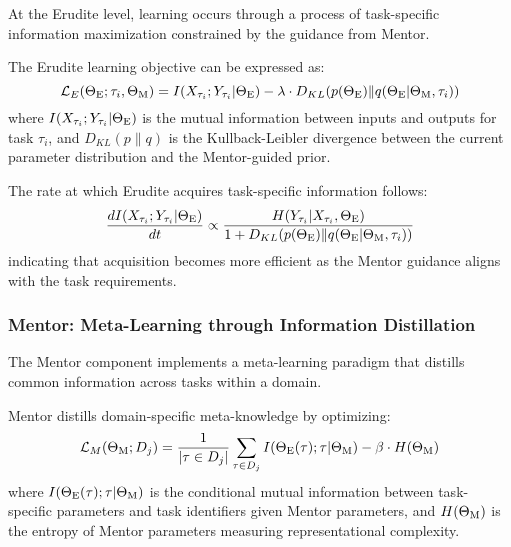 At the Erudite level, learning occurs through a process of task-specific information maximization constrained by the guidance from Mentor.

\begin{theorem}
The Erudite learning objective can be expressed as:
\begin{equation}
\mathcal{L}_E(\Theta_{\text{E}}; \tau_i, \Theta_{\text{M}}) = I(X_{\tau_i}; Y_{\tau_i} | \Theta_{\text{E}}) - \lambda \cdot D_{KL}(p(\Theta_{\text{E}}) \| q(\Theta_{\text{E}} | \Theta_{\text{M}}, \tau_i))
\end{equation}
where $I(X_{\tau_i}; Y_{\tau_i} | \Theta_{\text{E}})$ is the mutual information between inputs and outputs for task $\tau_i$, and $D_{KL}(p \| q)$ is the Kullback-Leibler divergence between the current parameter distribution and the Mentor-guided prior.
\end{theorem}

\begin{proposition}
The rate at which Erudite acquires task-specific information follows:
\begin{equation}
\frac{dI(X_{\tau_i}; Y_{\tau_i} | \Theta_{\text{E}})}{dt} \propto \frac{H(Y_{\tau_i} | X_{\tau_i}, \Theta_{\text{E}})}{1 + D_{KL}(p(\Theta_{\text{E}}) \| q(\Theta_{\text{E}} | \Theta_{\text{M}}, \tau_i))}
\end{equation}
indicating that acquisition becomes more efficient as the Mentor guidance aligns with the task requirements.
\end{proposition}

\subsubsection{Mentor: Meta-Learning through Information Distillation}

The Mentor component implements a meta-learning paradigm that distills common information across tasks within a domain.

\begin{theorem}
Mentor distills domain-specific meta-knowledge by optimizing:
\begin{equation}
\mathcal{L}_M(\Theta_{\text{M}}; D_j) = \frac{1}{|\tau \in D_j|} \sum_{\tau \in D_j} I(\Theta_{\text{E}}(\tau); \tau | \Theta_{\text{M}}) - \beta \cdot H(\Theta_{\text{M}})
\end{equation}
where $I(\Theta_{\text{E}}(\tau); \tau | \Theta_{\text{M}})$ is the conditional mutual information between task-specific parameters and task identifiers given Mentor parameters, and $H(\Theta_{\text{M}})$ is the entropy of Mentor parameters measuring representational complexity.
\end{theorem}

